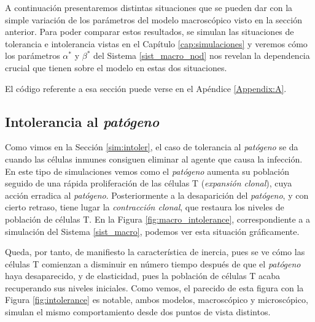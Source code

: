 A continuación presentaremos distintas situaciones que se pueden dar con la simple variación de los parámetros del modelo macroscópico visto en la sección anterior. Para poder comparar estos resultados, se simulan las situaciones de tolerancia e intolerancia vistas en el Capítulo \ref{cap:simulaciones} y veremos cómo los parámetros $\alpha^{*}$ y $\beta^{*}$ del Sistema \ref{sist_macro_nod} nos revelan la dependencia crucial que tienen sobre el modelo en estas dos situaciones.

El código referente a esa sección puede verse en el Apéndice \ref{Appendix:A}.



\subsection{Intolerancia al \textit{patógeno}}

Como vimos en la Sección \ref{sim:intoler}, el caso de tolerancia al \textit{patógeno} se da cuando las células inmunes consiguen eliminar al agente que causa la infección. 
En este tipo de simulaciones vemos como el \textit{patógeno} aumenta su población seguido de una rápida proliferación de las células T (\textit{expansión clonal}), cuya acción erradica al \textit{patógeno}. Posteriormente a la desaparición del \textit{patógeno}, y con cierto retraso, tiene lugar la \textit{contracción clonal}, que restaura los niveles de población de células T. En la Figura \ref{fig:macro_intolerance}, correspondiente a a simulación del Sistema \ref{sist_macro}, podemos ver esta situación gráficamente. 

Queda, por tanto, de manifiesto la característica de inercia, pues se ve cómo las células T comienzan a disminuir en número tiempo después de que el \textit{patógeno} haya desaparecido, y de elasticidad, pues la población de células T acaba recuperando sus niveles iniciales. Como vemos, el parecido de esta figura con la Figura \ref{fig:intolerance} es notable, ambos modelos, macroscópico y microscópico, simulan el mismo comportamiento desde dos puntos de vista distintos.


